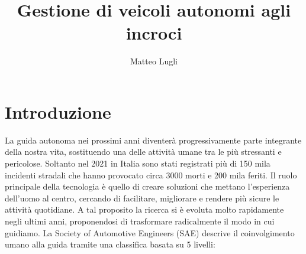 \documentclass[letterpaper, 12pt]{article}
\author{Matteo Lugli}
\date{}
\title{Gestione di veicoli autonomi agli incroci}
\begin{document}
\maketitle
\tableofcontents

\newpage
\section{Introduzione}
\label{sec:org09ff837}
La guida autonoma nei prossimi anni diventerà progressivamente parte
integrante della nostra vita, sostituendo una delle attività umane 
tra le più stressanti e pericolose. 
Soltanto nel 2021 in Italia sono stati registrati più di 150 mila incidenti
stradali che hanno provocato circa 3000 morti e 200 mila feriti.
Il ruolo principale della tecnologia è quello di creare soluzioni che mettano
l'esperienza dell'uomo al centro, cercando di facilitare, migliorare e rendere 
più sicure le attività quotidiane.
A tal proposito la ricerca si è evoluta molto rapidamente negli ultimi anni,
proponendosi di trasformare radicalmente il modo in cui guidiamo.
La Society of Automotive Engineers (SAE) descrive il coinvolgimento umano alla guida tramite
una classifica basata su 5 livelli:
\end{document}
